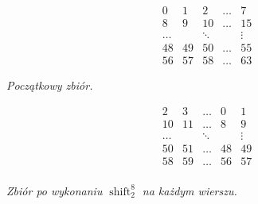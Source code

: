 \documentclass[a4paper]{article}
\newcommand{\shift}[2]{\operatorname{shift}_{#2}^{#1}}
\theoremstyle{definition}
\begin{document}
\begin{minipage}{.5\textwidth} %

\[
\begin{matrix}
 0 &  1 &  2 &  \ldots & 7 \\
 8 &  9 & 10 &  \ldots & 15 \\
\ldots & & \ddots &  & \vdots \\
48 & 49 & 50 & \ldots & 55 \\
56 & 57 & 58 & \ldots & 63 
\end{matrix}
\]

\begin{center} \it
    Początkowy zbiór.
\end{center}

\end{minipage} %
\begin{minipage}{.5\textwidth} %

\[
\begin{matrix}
 2  &  3 & \ldots &  0 &  1 \\
 10 & 11 & \ldots &  8 &  9 \\
\ldots & & \ddots &  & \vdots \\
 50 & 51 & \ldots & 48 & 49 \\
 58 & 59 & \ldots & 56 & 57 \\ 
\end{matrix}
\]

\begin{center} \it
    Zbiór po wykonaniu \(\shift 8 2\) na każdym wierszu.
\end{center}
\end{minipage}

\vspace{1em}
\end{document}
